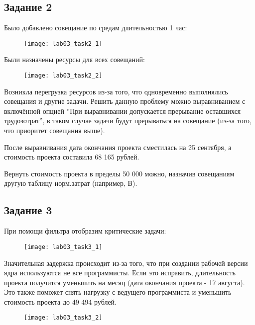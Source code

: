 \clearpage
\subsection*{Задание 2}

Было добавлено совещание по средам длительностью 1 час:
\begin{figure}[h!]
	\texttt{[image: lab03\_task2\_1]}
\end{figure}

Были назначены ресурсы для всех совещаний:
\begin{figure}[h!]
	\texttt{[image: lab03\_task2\_2]}
\end{figure}

Возникла перегрузка ресурсов из-за того, что одновременно выполнялись совещания и другие задачи. Решить данную проблему можно выравниванием с включённой опцией ''При выравнивании допускается прерывание оставшихся трудозотрат'', в таком случае задачи будут прерываться на совещание (из-за того, что приоритет совещания выше).

После выравнивания дата окончания проекта сместилась на 25 сентября, а стоимость проекта составила 68 165 рублей.

Вернуть стоимость проекта в пределы 50 000 можно, назначив совещаниям другую таблицу норм.затрат (например, В).


\clearpage
\subsection*{Задание 3}

При помощи фильтра отобразим критические задачи:

\begin{figure}[h!]
	\texttt{[image: lab03\_task3\_1]}
\end{figure}
\clearpage

Значительная задержка происходит из-за того, что при создании рабочей версии ядра используются не все программисты. Если это исправить, длительность проекта получится уменьшить на месяц (дата окончания проекта - 17 августа). Это также поможет снять нагрузку с ведущего программиста и уменьшить стоимость проекта до 49 494 рублей.
\begin{figure}[h!]
	\texttt{[image: lab03\_task3\_2]}
\end{figure}

